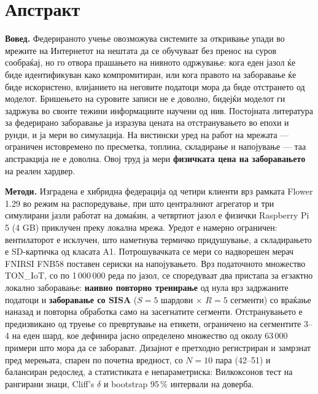 \chapter*{Апстракт}

\textbf{Вовед.} Федерираното учење овозможува системите за откривање упади во мрежите на
Интернетот на нештата да се обучуваат без пренос на суров сообраќај, но го отвора прашањето
на нивното одржување: кога еден јазол ќе биде идентификуван како компромитиран, или кога
правото на заборавање ќе биде искористено, влијанието на неговите податоци мора да биде
отстрането од моделот. Бришењето на суровите записи не е доволно, бидејќи моделот ги
задржува во своите тежини информациите научени од нив. Постојната литература за федерирано
заборавање ја изразува цената на отстранувањето во епохи и рунди, и ја мери во симулација.
На вистински уред на работ на мрежата --- ограничен истовремено по пресметка, топлина,
складирање и напојување --- таа апстракција не е доволна. Овој труд ја мери \textbf{физичката цена
на заборавањето} на реален хардвер.

\textbf{Методи.} Изградена е хибридна федерација од четири клиенти врз рамката Flower 1.29 во
режим на распоредување, при што централниот агрегатор и три симулирани јазли работат на
домаќин, а четвртиот јазол е физички Raspberry Pi 5 (4 GB) приклучен преку локална мрежа.
Уредот е намерно ограничен: вентилаторот е исклучен, што наметнува термичко придушување, а
складирањето е SD-картичка од класата A1. Потрошувачката се мери со надворешен мерач FNIRSI
FNB58 поставен сериски на напојувањето. Врз податочното множество TON\_IoT, со по 1\,000\,000
реда по јазол, се споредуваат два пристапа за егзактно локално заборавање: \textbf{наивно повторно
тренирање} од нула врз задржаните податоци и \textbf{заборавање со SISA} ($S = 5$ шардови
× $R = 5$ сегменти) со враќање наназад и повторна обработка само на засегнатите сегменти.
Отстранувањето е предизвикано од труење со превртување на етикети, ограничено на сегментите
3–4 на еден шард, кое дефинира јасно определено множество од околу 63\,000 примери што мора
да се заборават. Дизајнот е претходно регистриран и замрзнат пред мерењата, спарен по
почетна вредност, со $N = 10$ пара (42–51) и балансиран редослед, а статистиката е
непараметриска: Вилкоксонов тест на рангирани знаци, Cliff's $\delta$ и bootstrap 95\,\%
интервали на доверба.

